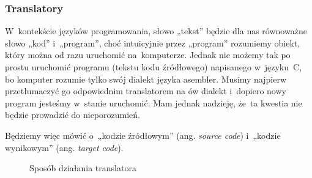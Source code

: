 \documentclass[10pt,t]{beamer}
\begin{document}
\begin{frame}
  \frametitle{Translatory}


  W~kontekście języków programowania, słowo „tekst” będzie dla nas
  równoważne słowo „kod” i~„program”, choć intuicyjnie przez „program”
  rozumiemy obiekt, który można od razu uruchomić na~komputerze. Jednak nie
  możemy tak po prostu uruchomić programu (tekstu kodu źródłowego)
  napisanego w~języku~C, bo komputer rozumie tylko swój dialekt języka
  asembler. Musimy najpierw przetłumaczyć go odpowiednim translatorem na ów
  dialekt i~dopiero nowy program jesteśmy w~stanie uruchomić. Mam jednak
  nadzieję, że~ta kwestia nie będzie prowadzić do nieporozumień.

  Będziemy więc mówić o~„kodzie źródłowym” (ang. \textit{source code})
  i~„kodzie wynikowym” (ang. \textit{target code}).





  \begin{figure}

    \label{fig:Translator-02}



    \caption{Sposób działania translatora}


  \end{figure}

\end{frame}
\end{document}
